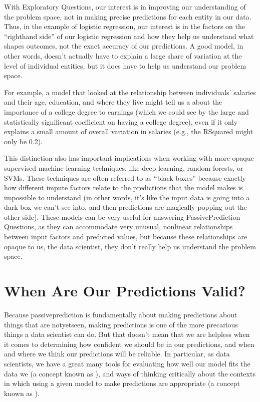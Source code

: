 \documentclass[letterpaper,10pt,english]{jupyterBook}
\begin{document}
\sphinxAtStartPar
With Exploratory Questions, our interest is in improving our understanding of the problem space, not in making precise predictions for each entity in our data. Thus, in the example of logistic regression, our interest is in the factors on the “right\sphinxhyphen{}hand side” of our logistic regression and how they help us understand what shapes outcomes, not the exact accuracy of our predictions. A good model, in other words, doesn’t actually have to explain a large share of variation at the level of individual entities, but it does have to help us understand our problem space.

\sphinxAtStartPar
For example, a model that looked at the relationship between individuals’ salaries and their age, education, and where they live might tell us a  about the importance of a college degree to earnings (which we could see by the large and statistically significant coefficient on having a college degree), even if it only explains a small amount of overall variation in salaries (e.g., the R\sphinxhyphen{}Squared might only be 0.2).

\sphinxAtStartPar
This distinction also has important implications when working with more opaque supervised machine learning techniques, like deep learning, random forests, or SVMs. These techniques are often referred to as “black boxes” because exactly how different impute factors relate to the predictions that the model makes is impossible to understand (in other words, it’s like the input data is going into a dark box we can’t see into, and then predictions are magically popping out the other side). These models can be very useful for answering Passive\sphinxhyphen{}Prediction Questions, as they can accommodate very unusual, non\sphinxhyphen{}linear relationships between input factors and predicted values, but because these relationships are opaque to us, the data scientist, they don’t really help us understand the problem space.


\section{When Are Our Predictions Valid?}
\label{\detokenize{30_questions/20_passive_prediction_questions:when-are-our-predictions-valid}}
\sphinxAtStartPar
Because passive\sphinxhyphen{}prediction is fundamentally about making predictions about things that are not\sphinxhyphen{}yet\sphinxhyphen{}seen, making predictions is one of the more precarious things a data scientist can do. But that doesn’t mean that we are helpless when it comes to determining how confident we should be in our predictions, and when and where we think our predictions will be reliable. In particular, as data scientists, we have a great many tools for evaluating how well our model fits the data we  (a concept known as ), and ways of thinking critically about the contexts in which using a given model to make predictions are appropriate (a concept known as ).
\end{document}
